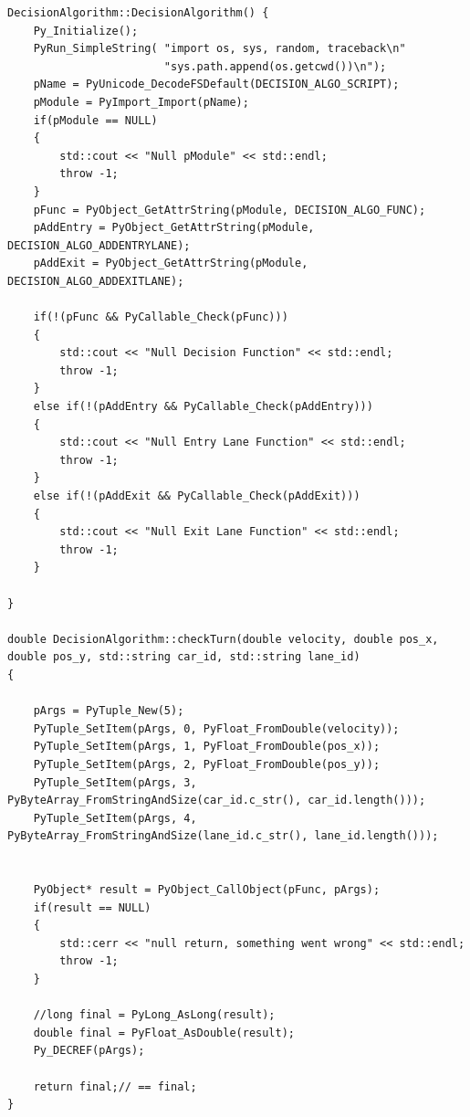 \documentclass[11pt,letterpaper]{article}
\begin{document}
\begin{lstlisting}[style=CPP, caption={Llamado a código Python externo desde C++ en el módulo \emph{DecisionAlgorithm}}, label={lst:embedded_python}]
DecisionAlgorithm::DecisionAlgorithm() {
    Py_Initialize();
    PyRun_SimpleString( "import os, sys, random, traceback\n"
                        "sys.path.append(os.getcwd())\n");
    pName = PyUnicode_DecodeFSDefault(DECISION_ALGO_SCRIPT);
    pModule = PyImport_Import(pName);
    if(pModule == NULL)
    {
        std::cout << "Null pModule" << std::endl;
        throw -1;
    }
    pFunc = PyObject_GetAttrString(pModule, DECISION_ALGO_FUNC);
    pAddEntry = PyObject_GetAttrString(pModule, DECISION_ALGO_ADDENTRYLANE);
    pAddExit = PyObject_GetAttrString(pModule, DECISION_ALGO_ADDEXITLANE);

    if(!(pFunc && PyCallable_Check(pFunc)))
    {
        std::cout << "Null Decision Function" << std::endl;
        throw -1;
    }
    else if(!(pAddEntry && PyCallable_Check(pAddEntry)))
    {
        std::cout << "Null Entry Lane Function" << std::endl;
        throw -1;
    }
    else if(!(pAddExit && PyCallable_Check(pAddExit)))
    {
        std::cout << "Null Exit Lane Function" << std::endl;
        throw -1;
    }

}

double DecisionAlgorithm::checkTurn(double velocity, double pos_x, double pos_y, std::string car_id, std::string lane_id)
{

    pArgs = PyTuple_New(5);
    PyTuple_SetItem(pArgs, 0, PyFloat_FromDouble(velocity));
    PyTuple_SetItem(pArgs, 1, PyFloat_FromDouble(pos_x));
    PyTuple_SetItem(pArgs, 2, PyFloat_FromDouble(pos_y));
    PyTuple_SetItem(pArgs, 3, PyByteArray_FromStringAndSize(car_id.c_str(), car_id.length()));
    PyTuple_SetItem(pArgs, 4, PyByteArray_FromStringAndSize(lane_id.c_str(), lane_id.length()));


    PyObject* result = PyObject_CallObject(pFunc, pArgs);
    if(result == NULL)
    {
        std::cerr << "null return, something went wrong" << std::endl;
        throw -1;
    }

    //long final = PyLong_AsLong(result);
    double final = PyFloat_AsDouble(result);
    Py_DECREF(pArgs);

    return final;// == final;
}
\end{lstlisting}


\end{document}
